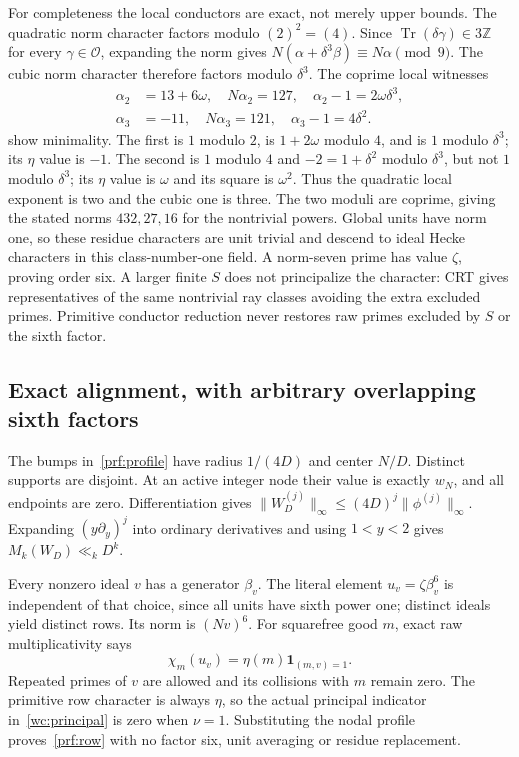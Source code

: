 \documentclass[11pt]{article}
\theoremstyle{definition}\newtheorem{definition}[theorem]{Definition}
\theoremstyle{remark}\newtheorem{remark}[theorem]{Remark}
\begin{document}
For completeness the local conductors are exact, not merely upper bounds.
The quadratic norm character factors modulo $(2)^2=(4)$.
Since $\operatorname{Tr}(\delta\gamma)\in3\mathbb Z$ for every
$\gamma\in\mathcal O$, expanding the norm gives
$N(\alpha+\delta^3\beta)\equiv N\alpha\pmod9$.
The cubic norm character therefore factors modulo $\delta^3$.
The coprime local witnesses
\begin{align*}
 \alpha_2&=13+6\omega,\quad N\alpha_2=127,\quad
 \alpha_2-1=2\omega\delta^3,\\
 \alpha_3&=-11,\quad N\alpha_3=121,\quad
 \alpha_3-1=4\delta^2.
\end{align*}
show minimality. The first is $1$ modulo $2$, is $1+2\omega$ modulo $4$,
and is $1$ modulo $\delta^3$; its $\eta$ value is $-1$.
The second is $1$ modulo $4$ and $-2=1+\delta^2$ modulo $\delta^3$,
but not $1$ modulo $\delta^3$; its $\eta$ value is $\omega$ and its square
is $\omega^2$. Thus the quadratic local exponent is two and the cubic
one is three. The two moduli are coprime, giving the stated norms
$432,27,16$ for the nontrivial powers. Global units have norm one, so
these residue characters are unit trivial and descend to ideal Hecke
characters in this class-number-one field. A norm-seven prime has value
$\zeta$, proving order six. A larger finite $S$ does not principalize the
character: CRT gives representatives of the same nontrivial ray classes
avoiding the extra excluded primes. Primitive conductor reduction never
restores raw primes excluded by $S$ or the sixth factor.

\subsection{Exact alignment, with arbitrary overlapping sixth factors}
The bumps in~\eqref{prf:profile} have radius $1/(4D)$ and center $N/D$.
Distinct supports are disjoint. At an active integer node their value is
exactly $w_N$, and all endpoints are zero. Differentiation gives
$\|W_D^{(j)}\|_\infty\le(4D)^j\|\phi^{(j)}\|_\infty$.
Expanding $(y\partial_y)^j$ into ordinary derivatives and using $1<y<2$
gives $M_k(W_D)\ll_kD^k$.

Every nonzero ideal $v$ has a generator $\beta_v$. The literal element
$u_v=\zeta\beta_v^6$ is independent of that choice, since all units have
sixth power one; distinct ideals yield distinct rows. Its norm is $(Nv)^6$.
For squarefree good $m$, exact raw multiplicativity says
\[
 \chi_m(u_v)=\eta(m)\mathbf1_{(m,v)=1}.
\]
Repeated primes of $v$ are allowed and its collisions with $m$ remain
zero. The primitive row character is always $\eta$, so the actual
principal indicator in~\eqref{wc:principal} is zero when $\nu=1$.
Substituting the nodal profile proves~\eqref{prf:row} with no factor six,
unit averaging or residue replacement.
\end{document}
